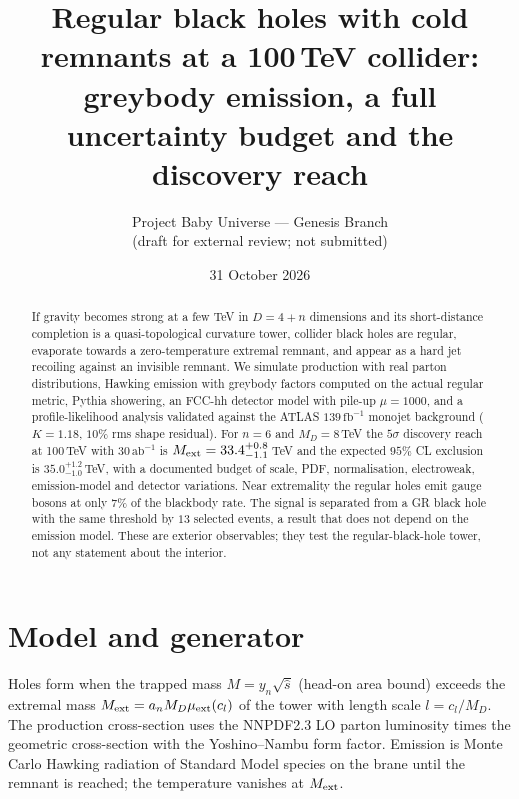 \documentclass[11pt,a4paper]{article}
\title{Regular black holes with cold remnants at a 100\,TeV collider:\\
greybody emission, a full uncertainty budget and the discovery reach}
\author{Project Baby Universe --- Genesis Branch\\ \small(draft for external review; not submitted)}
\date{31 October 2026}
\begin{document}
\maketitle

\begin{abstract}
If gravity becomes strong at a few TeV in $D=4+n$ dimensions and its short-distance completion is a quasi-topological curvature tower,
collider black holes are regular, evaporate towards a zero-temperature extremal remnant, and appear as a hard jet recoiling against an
invisible remnant. We simulate production with real parton distributions, Hawking emission with greybody factors computed on the actual
regular metric, Pythia showering, an FCC-hh detector model with pile-up $\mu=1000$, and a profile-likelihood analysis validated against the
ATLAS $139\,\mathrm{fb}^{-1}$ monojet background ($K=1.18$, $10\%$ rms shape residual). For $n=6$ and $M_D=8$\,TeV the $5\sigma$
discovery reach at 100\,TeV with $30\,\mathrm{ab}^{-1}$ is $M_{\rm ext}=33.4^{+0.8}_{-1.1}$\,TeV and the expected $95\%$ CL exclusion is
$35.0^{+1.2}_{-1.0}$\,TeV, with a documented budget of scale, PDF, normalisation, electroweak, emission-model and detector variations.
Near extremality the regular holes emit gauge bosons at only $7\%$ of the blackbody rate. The signal is separated from a GR black hole
with the same threshold by $13$ selected events, a result that does not depend on the emission model. These are exterior observables;
they test the regular-black-hole tower, not any statement about the interior.
\end{abstract}

\section{Model and generator}
Holes form when the trapped mass $M=y_n\sqrt{\hat s}$ (head-on area bound) exceeds the extremal mass
$M_{\rm ext}=a_n M_D\mu_{\rm ext}(c_l)$ of the tower with length scale $l=c_l/M_D$. The production cross-section uses the
NNPDF2.3 LO parton luminosity times the geometric cross-section with the Yoshino--Nambu form factor. Emission is Monte Carlo
Hawking radiation of Standard Model species on the brane until the remnant is reached; the temperature vanishes at $M_{\rm ext}$.
\end{document}

